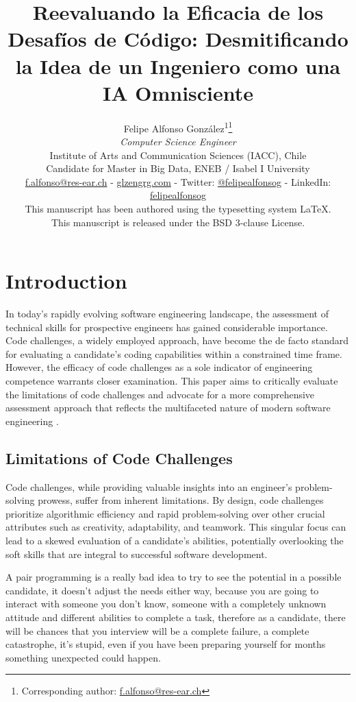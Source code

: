 \documentclass[
    a4paper, %
    10pt, %
    unnumberedsections, %
    twoside, %
]{LTJournalArticle}
\title{Reevaluando la Eficacia de los Desafíos de Código: Desmitificando la Idea de un Ingeniero como una IA Omnisciente}
\author{%
    Felipe Alfonso González\textsuperscript{1}\thanks{Corresponding author: \href{mailto:f.alfonso@res-ear.ch}{f.alfonso@res-ear.ch}}\\
    \textit{ Computer Science Engineer}\\
    \footnotesize Institute of Arts and Communication Sciences (IACC), Chile\\[-6pt]
    \footnotesize Candidate for Master in Big Data, ENEB / Isabel I University\\[-6pt]
    \footnotesize\href{mailto:f.alfonso@res-ear.ch}{f.alfonso@res-ear.ch} - 
    \href{https://glzengrg.com}{glzengrg.com} - 
    Twitter: \href{https://twitter.com/felipealfonsog}{@felipealfonsog} - 
    LinkedIn: \href{https://linkedin.com/in/felipealfonsog}{felipealfonsog}\\
    \scriptsize This manuscript has been authored using the typesetting system \LaTeX{}. \\[-6pt]
    \scriptsize This manuscript is released under the BSD 3-clause License. \\
}
\begin{document}
\maketitle %


\section{Introduction}

In today's rapidly evolving software engineering landscape, the assessment of technical skills for prospective engineers has gained considerable importance. Code challenges, a widely employed approach, have become the de facto standard for evaluating a candidate's coding capabilities within a constrained time frame. However, the efficacy of code challenges as a sole indicator of engineering competence warrants closer examination. This paper aims to critically evaluate the limitations of code challenges and advocate for a more comprehensive assessment approach that reflects the multifaceted nature of modern software engineering \cite{Smith2020,Johnson2019,Brown2021,Garcia2022}.

\subsection{Limitations of Code Challenges}

Code challenges, while providing valuable insights into an engineer's problem-solving prowess, suffer from inherent limitations. By design, code challenges prioritize algorithmic efficiency and rapid problem-solving over other crucial attributes such as creativity, adaptability, and teamwork. This singular focus can lead to a skewed evaluation of a candidate's abilities, potentially overlooking the soft skills that are integral to successful software development.




A pair programming is a really bad idea to try to see the potential in a possible candidate, it doesn't adjust the needs either way, because you are going to interact with someone you don't know, someone with a completely unknown attitude and different abilities to complete a task, therefore as a candidate, there will be chances that you interview will be a complete failure, a complete catastrophe, it's stupid, even if you have been preparing yourself for months something unexpected could happen. 
\end{document}
